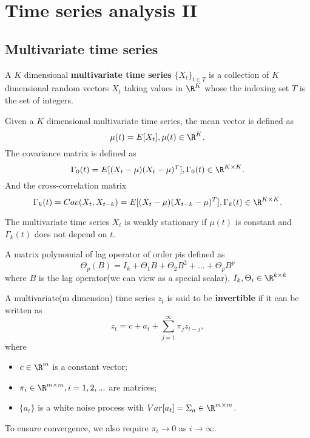 \printbibliography

\chapter{Time series analysis II}

\section{Multivariate time series}
\begin{definition}
A $K$ dimensional \textbf{multivariate time series }$\{X_t\}_{t\in T}$ is a collection of $K$ dimensional random vectors $X_t$ taking values in $\R^K$ whose the indexing set $T$ is the set of integers.
\end{definition}


\begin{definition}
Given a $K$ dimensional multivariate time series, 
the mean vector is defined as
$$\mu(t) = E[X_t],\mu(t)\in \R^K.$$
The covariance matrix is defined as
$$\Gamma_0(t) = E[(X_t - \mu)(X_t - \mu)^T], \Gamma_0(t) \in \R^{K\times K}.$$
And the cross-correlation matrix
$$\Gamma_k(t) = Cov(X_t,X_{t-k}) = E[(X_t - \mu)(X_{t-k} - \mu)^T],\Gamma_k(t) \in \R^{K\times K}.$$
\end{definition}


\begin{definition}
The multivariate time series $X_t$ is weakly stationary if
$\mu(t)$ is constant and $\Gamma_k(t)$ does not depend on $t$.
\end{definition}

\begin{definition}
A matrix polynomial  of lag operator of order $p$is defined as
$$\Theta_p(B) = I_k + \Theta_1B + \Theta_2 B^2 + ... + \Theta_p B^p$$
where $B$ is the lag operator(we can view as a special scalar), $I_k,\Theta_i \in \R^{k\times k}$
\end{definition}


\begin{definition}[invertibility]\cite[7]{tsay2013multivariate}
A multivariate(m dimension) time series $z_t$ is said to be \textbf{invertible} if it can be written as
$$z_t = c + a_t + \sum_{j=1}^\infty \pi_j z_{t-j},$$
where
\begin{itemize}
	\item $c\in \R^m $ is a constant vector;
	\item $\pi_i \in \R^{m\times m}, i=1,2,...$ are matrices;
	\item $\{a_t\}$ is a white noise process with $Var[a_t] = \Sigma_a \in \R^{m\times m}$. 
\end{itemize}

To ensure convergence, we also require $\pi_i\to 0$ as $i\to \infty$.
\end{definition}



